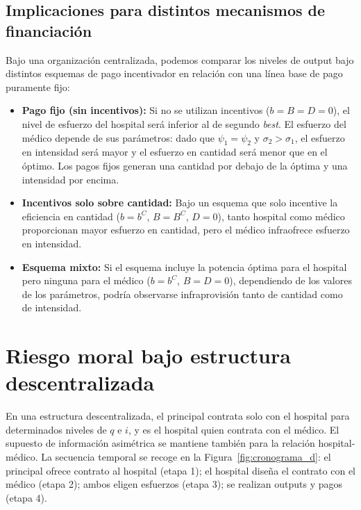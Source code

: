 \documentclass[12pt, a4paper, twoside, openright]{book}
\theoremstyle{plain}
\theoremstyle{definition}
\theoremstyle{remark}
\begin{document}
\subsection{Implicaciones para distintos mecanismos de financiación}

Bajo una organización centralizada, podemos comparar los niveles de output bajo distintos esquemas de pago incentivador en relación con una línea base de pago puramente fijo:

\begin{itemize}
  \item \textbf{Pago fijo (sin incentivos):} Si no se utilizan incentivos ($b=B=D=0$), el nivel de esfuerzo del hospital será inferior al de segundo \textit{best}. El esfuerzo del médico depende de sus parámetros: dado que $\psi_1=\psi_2$ y $\sigma_2>\sigma_1$, el esfuerzo en intensidad será mayor y el esfuerzo en cantidad será menor que en el óptimo. Los pagos fijos generan una cantidad por debajo de la óptima y una intensidad por encima.

  \item \textbf{Incentivos solo sobre cantidad:} Bajo un esquema que solo incentive la eficiencia en cantidad ($b=b^C$, $B=B^C$, $D=0$), tanto hospital como médico proporcionan mayor esfuerzo en cantidad, pero el médico infraofrece esfuerzo en intensidad.

  \item \textbf{Esquema mixto:} Si el esquema incluye la potencia óptima para el hospital pero ninguna para el médico ($b=b^C$, $B=D=0$), dependiendo de los valores de los parámetros, podría observarse infraprovisión tanto de cantidad como de intensidad.
\end{itemize}


\section{Riesgo moral bajo estructura descentralizada}
\label{sec:descentralizada}

En una estructura descentralizada, el principal contrata solo con el hospital para determinados niveles de $q$ e $i$, y es el hospital quien contrata con el médico. El supuesto de información asimétrica se mantiene también para la relación hospital-médico. La secuencia temporal se recoge en la Figura~\ref{fig:cronograma_d}: el principal ofrece contrato al hospital (etapa 1); el hospital diseña el contrato con el médico (etapa 2); ambos eligen esfuerzos (etapa 3); se realizan outputs y pagos (etapa 4).
\end{document}

